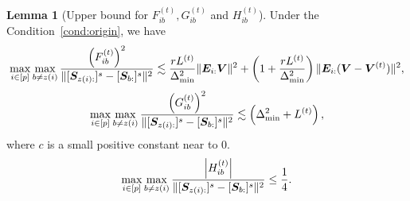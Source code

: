 \documentclass[lettersize,onecolumn,journal]{IEEEtran}
\theoremstyle{definition}
\newtheorem{lem}{Lemma}
\theoremstyle{definition}
\newcommand{\of}[1]{\left(#1\right)}
\newcommand{\aabs}[1]{\left|#1\right|}
\begin{document}
    \begin{lem}[Upper bound for $F_{ib}^{(t)}, G_{ib}^{(t)}$ and $H_{ib}^{(t)}$]\label{lem:upper_fgh} Under the Condition~\ref{cond:origin}, we have 
    \begin{equation}\label{eq:fib}
        \max_{i \in [p]} \max_{b \neq z(i)} \frac{\of{F_{ib}^{(t)}}^2}{ \onormSize{}{ [  \mS_{z(i):} ]^s  -  [ \mS_{b:} ]^s }^2 } \lesssim  \frac{r L^{(t)}}{ \Delta_{\min}^2} \onormSize{}{\mE_{i:} \mV}^2 + \of{1 +  \frac{ r L^{(t)}}{ \Delta_{\min}^2}} \onormSize{}{\mE_{i:} (\mV - \mV^{(t)})}^2 ,
    \end{equation}
    \begin{equation}\label{eq:gib}
        \max_{i \in [p]} \max_{b \neq z(i)} \frac{ \of{  G_{ib}^{(t)} }^2  }{ \onormSize{}{ [\mS_{z(i):} ]^s - [\mS_{b:}]^s }^2}  \lesssim \of{ \Delta_{\min}^2 +L^{(t)}},
    \end{equation}
    where $c$ is a small positive constant near to 0.
    \begin{equation}\label{eq:hib}
        \max_{i \in [p]} \max_{b \neq z(i)}  \frac{ \aabs{  H_{ib}^{(t)} }  }{ \onormSize{}{ [\mS_{z(i):} ]^s - [\mS_{b:}]^s }^2} \leq \frac{1}{4}.
    \end{equation}
    \end{lem}
    
\end{document}
